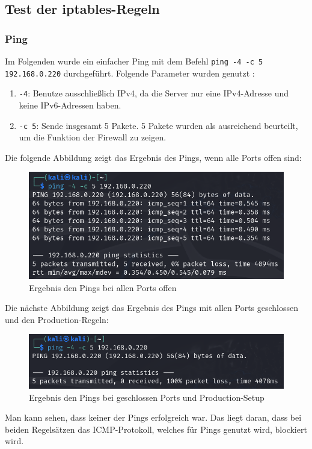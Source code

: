 \documentclass[
    a4paper,
    pagesize,
	pdftex,
    12pt,
]{scrartcl}
\begin{document}
\subsection{Test der iptables-Regeln}

\subsubsection{Ping}
Im Folgenden wurde ein einfacher Ping mit dem Befehl \lstinline[breaklines]|ping -4 -c 5 192.168.0.220| durchgeführt.
Folgende Parameter wurden genutzt \cite{ping-manpage}:
\begin{enumerate}
	\item \lstinline[breaklines]|-4|: Benutze ausschließlich IPv4, da die Server nur eine IPv4-Adresse und keine IPv6-Adressen haben.
	\item \lstinline[breaklines]|-c 5|: Sende insgesamt 5 Pakete. 5 Pakete wurden als ausreichend beurteilt, um die Funktion der Firewall zu zeigen. 
\end{enumerate}

Die folgende Abbildung zeigt das Ergebnis des Pings, wenn alle Ports offen sind:
\begin{figure}[H]
	\centering
	\includegraphics[width=12cm]{ping-all-open.png}
	\caption{Ergebnis den Pings bei allen Ports offen}
	\label{fig:ping-all-open}
\end{figure}

Die nächste Abbildung zeigt das Ergebnis des Pings mit allen Ports geschlossen und den Production-Regeln:
\begin{figure}[H]
	\centering
	\includegraphics[width=12cm]{ping-all-closed.png}
	\caption{Ergebnis den Pings bei geschlossen Ports und Production-Setup}
	\label{fig:ping-all-closed}
\end{figure}
Man kann sehen, dass keiner der Pings erfolgreich war. Das liegt daran, dass bei beiden Regelsätzen das ICMP-Protokoll, welches für Pings genutzt wird, blockiert wird.
\end{document}
